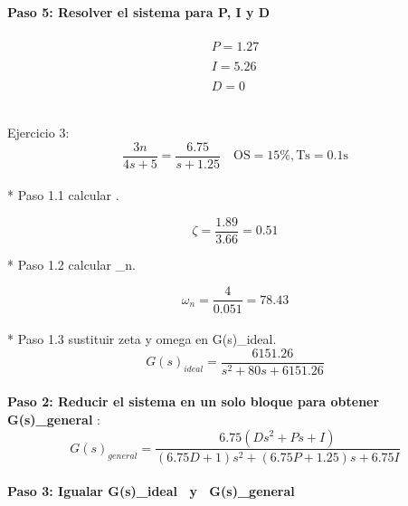 \documentclass[12pt,letterpaper]{article}
\begin{document}
\textbf{Paso 5: Resolver el sistema para P, I y D } \\ \\

\begin{equation}\begin{array}{l}
P=1.27\\ \\ 
I=5.26\\ \\ 
D=0
\end{array}\end{equation} \\ 
 

\setcounter{equation}{0} %

Ejercicio 3: \\ 

\begin{equation}\frac{3n}{4s+5} = \frac{6.75}{s+1.25} \quad \mathrm{OS}=15 \%, \mathrm{Ts}=0.1 \mathrm{s}\end{equation} \\


* Paso 1.1 calcular \zeta.

\begin{equation}\zeta=\frac{1.89}{3.66} = 0.51\end{equation} 

* Paso 1.2 calcular \omega_{n}. 

\begin{equation}\omega_{n}=\frac{4}{0.051}=78.43\end{equation}  \\

* Paso 1.3 sustituir zeta y omega en G(s)_{ideal}. \\ 

\begin{equation}G(s)_{ideal}=\frac{6151.26}{s^{2}+80s + 6151.26}\end{equation} \\ 

\textbf{Paso 2: Reducir el sistema en un solo bloque para obtener G(s)_{general} }: \\

\begin{equation}G(s)_{general} =  \frac{6.75(Ds^{2}+Ps+I)}{(6.75D+1)s^{2}+(6.75P+1.25)s+6.75I}\end{equation} \\ 

\textbf{Paso 3: Igualar  {G(s)_{ideal} \ y \ G(s)_{general}} } \\ 
\end{document}
